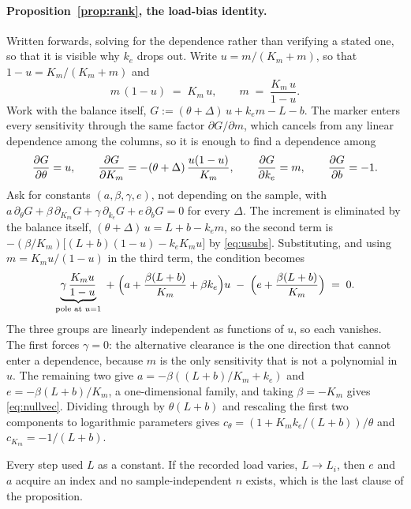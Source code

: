 \paragraph{Proposition~\ref{prop:rank}, the load-bias identity.} Written forwards, solving
for the dependence rather than verifying a stated one, so that it is visible why $k_e$ drops
out. Write $u = m/(K_m+m)$, so that $1-u = K_m/(K_m+m)$ and
\begin{equation}
m\,(1-u) \;=\; K_m\, u, \qquad m \;=\; \frac{K_m\,u}{1-u}.
\label{eq:usubs}
\end{equation}
Work with the balance itself, $G := (\theta+\Delta)\,u + k_e m - L - b$. The marker enters
every sensitivity through the same factor $\partial G/\partial m$, which cancels from any
linear dependence among the columns, so it is enough to find a dependence among
\begin{equation}
\frac{\partial G}{\partial \theta} = u, \qquad
\frac{\partial G}{\partial K_m} = -(\theta+\Delta)\,\frac{u(1-u)}{K_m}, \qquad
\frac{\partial G}{\partial k_e} = m, \qquad
\frac{\partial G}{\partial b} = -1.
\label{eq:Gsens}
\end{equation}
Ask for constants $(a, \beta, \gamma, e)$, not depending on the sample, with
$a\,\partial_\theta G + \beta\,\partial_{K_m} G + \gamma\,\partial_{k_e} G
+ e\,\partial_b G = 0$ for every $\Delta$. The increment is eliminated by the balance
itself, $(\theta+\Delta)\,u = L + b - k_e m$, so the second term is
$-(\beta/K_m)\bigl[(L+b)(1-u) - k_e K_m u\bigr]$ by \eqref{eq:usubs}. Substituting, and
using $m = K_m u/(1-u)$ in the third term, the condition becomes
\begin{equation}
\underbrace{\gamma\,\frac{K_m u}{1-u}}_{\text{pole at }u=1}
\;+\; \Bigl(a + \frac{\beta (L+b)}{K_m} + \beta k_e\Bigr) u
\;-\; \Bigl(e + \frac{\beta (L+b)}{K_m}\Bigr) \;=\; 0.
\label{eq:inu}
\end{equation}
The three groups are linearly independent as functions of $u$, so each vanishes. The first
forces $\gamma = 0$: the alternative clearance is the one direction that cannot enter a
dependence, because $m$ is the only sensitivity that is not a polynomial in $u$. The
remaining two give $a = -\beta((L+b)/K_m + k_e)$ and $e = -\beta(L+b)/K_m$, a
one-dimensional family, and taking $\beta = -K_m$ gives \eqref{eq:nullvec}. Dividing through
by $\theta(L+b)$ and rescaling the first two components to logarithmic parameters gives
$c_\theta = (1 + K_m k_e/(L+b))/\theta$ and $c_{K_m} = -1/(L+b)$.

Every step used $L$ as a constant. If the recorded load varies, $L \to L_i$, then $e$ and
$a$ acquire an index and no sample-independent $n$ exists, which is the last clause of the
proposition.

